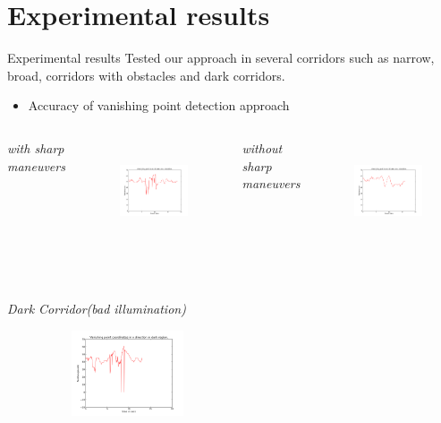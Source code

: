 \documentclass[8pt]{beamer}
\begin{document}
{{\section{Experimental results}
\begin{frame}{Experimental results}
 Tested our approach in several corridors such as narrow, broad, corridors with obstacles and dark corridors.\\[2pt]
\begin{itemize}
 \item Accuracy of vanishing point detection approach
\end{itemize}
\vspace{0.3cm}
\begin{columns}
  {\centering \small{\textit{with sharp maneuvers}\par}}
  \begin{figure}
  \includegraphics[width=5cm, height=3cm]{images/vpRobustness1a.png}
  \end{figure}
  {\centering \small{\textit{without sharp maneuvers}\par}}
  \begin{figure}
   \includegraphics[width=5cm, height=3cm]{images/vpRobustness2a.png}
   \end{figure}
\end{columns}\\[2pt]
{\centering \small{\textit{Dark Corridor(bad illumination)}\par}}
\begin{figure}
\includegraphics[width=5cm, height=2.5cm]{images/vpinDarkfloor.png}
\end{figure}%


\end{frame}}}
\end{document}
